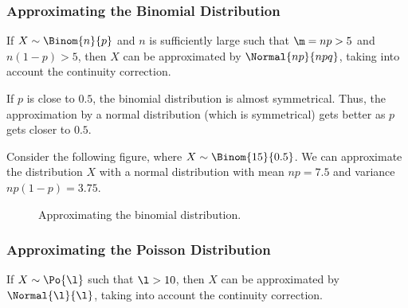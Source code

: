 \subsubsection{Approximating the Binomial Distribution}

\begin{proposition}
    If $X \sim \Binom{n}{p}$ and $n$ is sufficiently large such that $\m = np > 5$ and $n(1-p) > 5$, then $X$ can be approximated by $\Normal{np}{npq}$, taking into account the continuity correction.
\end{proposition}

If $p$ is close to $0.5$, the binomial distribution is almost symmetrical. Thus, the approximation by a normal distribution (which is symmetrical) gets better as $p$ gets closer to $0.5$.

Consider the following figure, where $X \sim \Binom{15}{0.5}$. We can approximate the distribution $X$ with a normal distribution with mean $np = 7.5$ and variance $np(1-p) = 3.75$.

\begin{figure}[H]
\centering
{}
\caption{Approximating the binomial distribution.}
\end{figure}

\subsubsection{Approximating the Poisson Distribution}

\begin{proposition}
    If $X \sim \Po{\l}$ such that $\l > 10$, then $X$ can be approximated by $\Normal{\l}{\l}$, taking into account the continuity correction.
\end{proposition}

